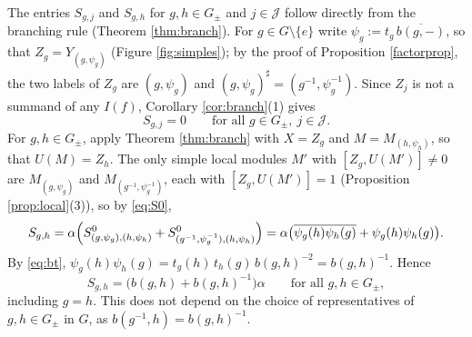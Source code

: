 \documentclass[10pt]{article}
\theoremstyle{plain}
\theoremstyle{definition}
\theoremstyle{plain}
\begin{document}
\par The entries $S_{g,j}$ and $S_{g,h}$ for $g,h\in G_{\pm}$ and $j\in\mathcal{J}$ follow directly from the branching rule (Theorem \ref{thm:branch}). For $g\in G\setminus\{e\}$ write $\psi_g:=t_g\,\overline{b(g,-)}$, so that $Z_g=Y_{(g,\psi_g)}$ (Figure \ref{fig:simples}); by the proof of Proposition \ref{factorprop}, the two labels of $Z_g$ are $(g,\psi_g)$ and $(g,\psi_g)^\sharp=(g^{-1},\psi_g^{-1})$. Since $Z_j$ is not a summand of any $I(f)$, Corollary \ref{cor:branch}(1) gives
\begin{equation}\label{eq:Sgj}
S_{g,j}=0\qquad\text{for all }g\in G_{\pm},\ j\in\mathcal{J}.
\end{equation}
For $g,h\in G_{\pm}$, apply Theorem \ref{thm:branch} with $X=Z_g$ and $M=M_{(h,\psi_h)}$, so that $U(M)=Z_h$. The only simple local modules $M'$ with $[Z_g,U(M')]\neq0$ are $M_{(g,\psi_g)}$ and $M_{(g^{-1},\psi_g^{-1})}$, each with $[Z_g,U(M')]=1$ (Proposition \ref{prop:local}(3)), so by \eqref{eq:S0},
\[
S_{g,h}=\alpha\Bigl(S^0_{(g,\psi_g),(h,\psi_h)}+S^0_{(g^{-1},\psi_g^{-1}),(h,\psi_h)}\Bigr)=\alpha\bigl(\overline{\psi_g(h)\psi_h(g)}+\psi_g(h)\psi_h(g)\bigr).
\]
By \eqref{eq:bt}, $\psi_g(h)\psi_h(g)=t_g(h)\,t_h(g)\,b(g,h)^{-2}=b(g,h)^{-1}$. Hence
\begin{equation}\label{eq:Sgh}
S_{g,h}=\bigl(b(g,h)+b(g,h)^{-1}\bigr)\alpha\qquad\text{for all }g,h\in G_{\pm},
\end{equation}
including $g=h$. This does not depend on the choice of representatives of $g,h\in G_{\pm}$ in $G$, as $b(g^{-1},h)=b(g,h)^{-1}$.
\end{document}
